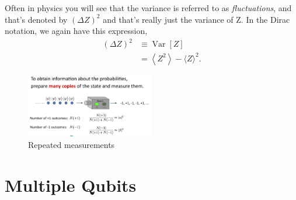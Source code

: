 Often in physics you will see that the variance is referred to as \emph{fluctuations}, and that's denoted by $(\Delta Z)^2$ and that's really just the variance of Z. In the Dirac notation, we again have this expression,
\begin{equation}
\begin{aligned}
(\Delta Z)^{2} & \equiv \operatorname{Var}[Z] \\
&=\left\langle Z^{2}\right\rangle-\langle Z\rangle^{2}.
\end{aligned}
\end{equation}


\begin{figure}[H]
    \centering
    \includegraphics[width=0.5\textwidth]{lesson2/many_copies_machine.pdf}
    
        \caption{Repeated measurements}
    
    \label{fig:many-copies}
\end{figure}


\section{Multiple Qubits}
\label{sec:multi-qubit}

